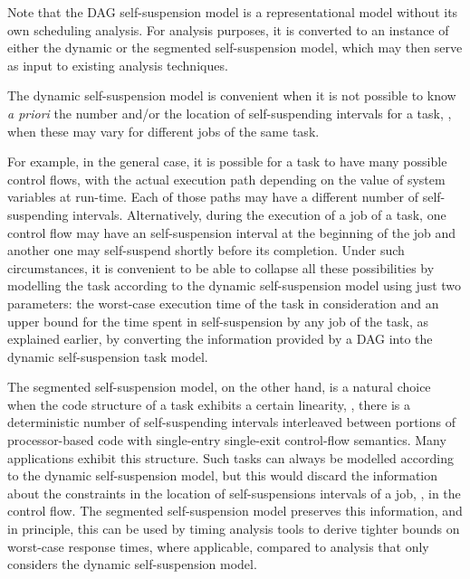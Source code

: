 Note that the DAG self-suspension model is a representational model without its own scheduling analysis. For analysis purposes, it is converted to an instance of either the dynamic or the segmented self-suspension model, which may then serve as input to existing analysis techniques. 

The dynamic self-suspension model is convenient when it is not possible to know \textit{a priori} the number and/or the location of self-suspending intervals for a task, \eg, when these may vary for different jobs of the same task.

For example, in the general case, it is possible for a task to have many possible control flows, with the actual execution path depending on the value
of system variables at run-time. Each of those paths may have a different
number of self-suspending intervals. Alternatively, during the execution of a job of a task, one control flow may have an self-suspension interval at the beginning of the job and
another one may self-suspend shortly before its completion. Under such circumstances, it is convenient to be able to collapse all these possibilities
by modelling the task according to the dynamic self-suspension model using
just two parameters: the worst-case execution time of the task in consideration and an upper bound for the time spent in self-suspension by any job of the task, as explained earlier, by converting the information provided by a DAG into the dynamic self-suspension task model. 
  
The segmented self-suspension model, on the other hand, is a natural choice when the code structure of a task exhibits a certain linearity,
\ie, there is a deterministic number of self-suspending intervals interleaved between portions of processor-based code with single-entry
single-exit control-flow semantics. Many applications exhibit this structure. Such tasks can always be modelled according to the dynamic self-suspension
model, but this would discard the information about the constraints in the location of self-suspensions intervals of a job, \eg, in the control flow. The segmented self-suspension model preserves this information, and in principle, this can be used by timing analysis tools 
to derive tighter bounds on worst-case response times, where applicable, compared to analysis that only considers the dynamic self-suspension model. 


